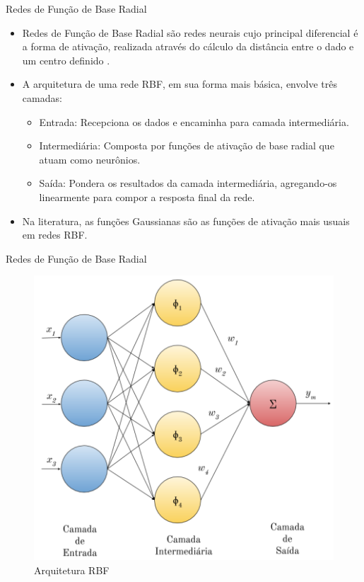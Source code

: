 \documentclass[10pt]{beamer}
\begin{document}
\begin{frame}{Redes de Função de Base Radial}
    \begin{itemize}
        \item<1 -> \alert{Redes de Função de Base Radial} são redes neurais cujo principal diferencial é a forma de ativação, realizada através do cálculo da distância entre o dado e um centro definido \cite{Braga:RedesNeuraisTeoriaAplicacoes}.
        \item<2 -> A arquitetura de uma rede RBF, em sua forma mais básica, envolve três camadas:
        \begin{itemize}
            \item<3 -> \alert{Entrada}: Recepciona os dados e encaminha para camada intermediária.
            \item<4 -> \alert{Intermediária}: Composta por funções de ativação de base radial que atuam como neurônios.
            \item<5 -> \alert{Saída}: Pondera os resultados da camada intermediária, agregando-os linearmente para compor a resposta final da rede.
        \end{itemize}
        \item<6 -> Na literatura, as funções Gaussianas são as funções de ativação mais usuais em redes RBF.
      \end{itemize}
\end{frame}

\begin{frame}{Redes de Função de Base Radial}
    \begin{figure}[H]
    \begin{center}
        \includegraphics[scale=0.6]{imagens/rbf_arq.png}
        \caption{Arquitetura RBF}
        \label{fig:rbg_arq}
    \end{center}
    \end{figure}
\end{frame}
\end{document}
